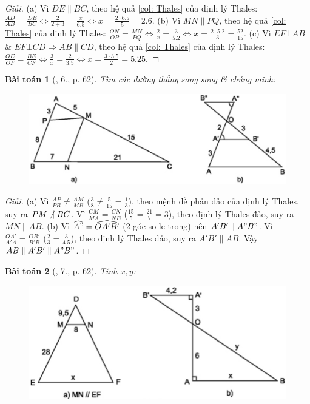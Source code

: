 \documentclass{article}
\newtheorem{baitoan}{Bài toán}
\begin{document}
\begin{proof}[Giải]
	(a) Vì $DE\parallel BC$, theo hệ quả \ref{col: Thales} của định lý Thales: $\frac{AD}{AB} = \frac{DE}{BC}\Leftrightarrow\frac{2}{2 + 3} = \frac{x}{6.5}\Leftrightarrow x = \frac{2\cdot6.5}{5} = 2.6$. (b) Vì $MN\parallel PQ$, theo hệ quả \ref{col: Thales} của định lý Thales: $\frac{ON}{OP} = \frac{MN}{PQ}\Leftrightarrow\frac{2}{x} = \frac{3}{5.2}\Leftrightarrow x = \frac{2\cdot5.2}{3} = \frac{52}{15}$. (c) Vì $EF\bot AB$ \& $EF\bot CD\Rightarrow AB\parallel CD$, theo hệ quả \ref{col: Thales} của định lý Thales: $\frac{OE}{OF} = \frac{BE}{CF}\Leftrightarrow\frac{3}{x} = \frac{2}{3.5}\Leftrightarrow x = \frac{3\cdot3.5}{2} = 5.25$.
\end{proof}

\begin{baitoan}[\cite{SGK_Toan_8_tap_2}, 6., p. 62]
	Tìm các đường thẳng song song \& chứng minh:
	\begin{figure}[H]
		\centering
		\includegraphics[scale=.25]{SGK_Toan_8_13}
	\end{figure}
\end{baitoan}

\begin{proof}[Giải]
	(a) Vì $\frac{AP}{PB}\ne\frac{AM}{MB}$ ($\frac{3}{8}\ne\frac{5}{15} = \frac{1}{3}$), theo mệnh đề phản đảo của định lý Thales, suy ra $PM\not\,\parallel BC$. Vì $\frac{CM}{MA} = \frac{CN}{NB}$ ($\frac{15}{5} = \frac{21}{7} = 3$), theo định lý Thales đảo, suy ra $MN\parallel AB$. (b) Vì $\widehat{A"} = \widehat{OA'B'}$ (2 góc so le trong) nên $A'B'\parallel A"B"$. Vì $\frac{OA'}{A'A} = \frac{OB'}{B'B}$ ($\frac{2}{3} = \frac{3}{4.5}$), theo định lý Thales đảo, suy ra $A'B'\parallel AB$. Vậy $AB\parallel A'B'\parallel A"B"$.
\end{proof}

\begin{baitoan}[\cite{SGK_Toan_8_tap_2}, 7., p. 62]
	Tính $x,y$:
	\begin{figure}[H]
		\centering
		\includegraphics[scale=.25]{SGK_Toan_8_14}
	\end{figure}
\end{baitoan}
\end{document}
